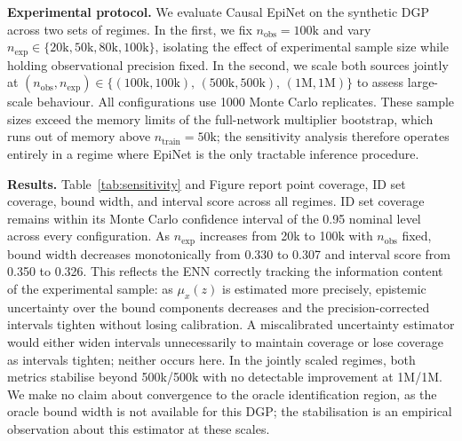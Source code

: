 \documentclass[accepted]{uai2026} %
\theoremstyle{plain}
\theoremstyle{definition}
\theoremstyle{remark}
\begin{document}
\textbf{Experimental protocol.} We evaluate Causal EpiNet on the 
\citet{li2022probabilitiescausationadequatesize} synthetic
DGP across two sets of regimes. In the first, we fix $n_\mathrm{obs} = 100\mathrm{k}$
and vary $n_\mathrm{exp} \in \{20\mathrm{k}, 50\mathrm{k}, 80\mathrm{k},
100\mathrm{k}\}$, isolating the effect of experimental sample size while holding
observational precision fixed. In the second, we scale both sources jointly at
$(n_\mathrm{obs}, n_\mathrm{exp}) \in \{(100\mathrm{k}, 100\mathrm{k}),\,
(500\mathrm{k}, 500\mathrm{k}),\, (1\mathrm{M}, 1\mathrm{M})\}$ to assess large-scale
behaviour. All configurations use 1000 Monte Carlo replicates. These sample sizes
exceed the memory limits of the full-network multiplier bootstrap, which runs out of
memory above $n_\mathrm{train} = 50\mathrm{k}$; the sensitivity analysis therefore
operates entirely in a regime where EpiNet is the only tractable inference procedure.

\textbf{Results.} Table~\ref{tab:sensitivity} and Figure report
point coverage, ID set coverage, bound width, and interval score across all regimes.
ID set coverage remains within its Monte Carlo confidence interval of the 0.95 nominal
level across every configuration. As $n_\mathrm{exp}$ increases from 20k to 100k with
$n_\mathrm{obs}$ fixed, bound width decreases monotonically from 0.330 to 0.307 and
interval score from 0.350 to 0.326. This reflects the ENN correctly tracking the
information content of the experimental sample: as $\mu_x(z)$ is estimated more
precisely, epistemic uncertainty over the bound components decreases and the
precision-corrected intervals tighten without losing calibration. A miscalibrated
uncertainty estimator would either widen intervals unnecessarily to maintain coverage
or lose coverage as intervals tighten; neither occurs here. In the jointly scaled
regimes, both metrics stabilise beyond 500k/500k with no detectable improvement at
1M/1M. We make no claim about convergence to the oracle identification region, as the
oracle bound width is not available for this DGP; the stabilisation is an empirical
observation about this estimator at these scales.
\end{document}
